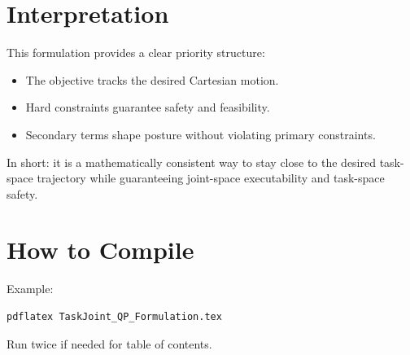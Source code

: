 \documentclass[11pt,a4paper]{article}
\begin{document}
\section{Interpretation}

This formulation provides a clear priority structure:
\begin{itemize}
\item The objective tracks the desired Cartesian motion.
\item Hard constraints guarantee safety and feasibility.
\item Secondary terms shape posture without violating primary constraints.
\end{itemize}

In short: it is a mathematically consistent way to stay close to the desired task-space trajectory while guaranteeing joint-space executability and task-space safety.

\section{How to Compile}

Example:
\begin{verbatim}
pdflatex TaskJoint_QP_Formulation.tex
\end{verbatim}
Run twice if needed for table of contents.
\end{document}
